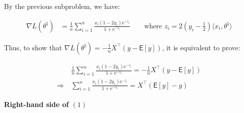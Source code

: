 \documentclass{article}
\begin{document}
By the previous subproblem, we have:

\begin{align*}
    \nabla L(\theta^{\natural}) 
    &= \frac{1}{n} \sum_{i = 1}^n \frac{x_i(1 - 2y_i)\mathrm{e}^{-z_i}}{1 + \mathrm{e}^{-z_i}} 
    \qquad \text{where } z_i = 2(y_i - \frac{1}{2})\langle x_i, \theta^{\natural} \rangle \tag{*}
\end{align*}

Thus, to show that $\nabla L ( \theta^\natural ) = - \frac{1}{n} X^\intercal  (y - \mathsf{E} [ y ] )$,  
it is equivalent to prove:

\begin{align*}
    &\frac{1}{n} \sum_{i = 1}^n \frac{x_i(1 - 2y_i)\mathrm{e}^{-z_i}}{1 + \mathrm{e}^{-z_i}} = - \frac{1}{n} X^\intercal  (y - \mathsf{E} [ y ]) \\
    \Rightarrow \ &\sum_{i = 1}^n \frac{x_i(1 - 2y_i)\mathrm{e}^{-z_i}}{1 + \mathrm{e}^{-z_i}} = X^\intercal  (\mathsf{E} [ y ] - y) \tag{1}
\end{align*}

\begin{comment}
If we reformulate the left-hand side into matrix form, 
by using the definition of $X$, and define $u_i = \frac{(1 - 2y_i)\mathrm{e}^{-z_i}}{1 + \mathrm{e}^{-z_i}}$, 
we have:
    
\begin{align*}
    \sum_{i = 1}^n \frac{x_i(1 - 2y_i)\mathrm{e}^{-z_i}}{1 + \mathrm{e}^{-z_i}} 
    &= \sum_{i = 1}^n x_i u_i \\
    &= \begin{bmatrix}
        x_1 & x_2 & \cdots & x_n
    \end{bmatrix}
    \begin{bmatrix}
        u_1 \\
        u_2 \\
        \vdots \\
        u_n
    \end{bmatrix} \\
    &= X^\intercal u
\end{align*}

Therefore, the equation $(1)$ that we need to prove is equivalent to:

\begin{align*}
    X^\intercal u = X^\intercal  (\mathsf{E} [ y ] - y) \tag{2}
\end{align*}
\end{comment}

\begin{center}
    \textbf{Right-hand side of $(1)$}
\end{center}
\end{document}
